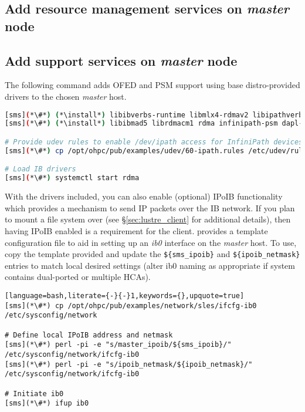 \documentclass[letterpaper]{article}
\newcommand{\install}{zypper -n install}
\begin{document}




\subsection{Add resource management services on {\em master} node} \label{sec:add_rm}


\subsection{Add \InfiniBand{} support services on {\em master} node} \label{sec:add_ofed}

The following command adds OFED and PSM support using base distro-provided drivers
to the chosen {\em master} host.

\begin{lstlisting}[language=bash,keywords={}]
[sms](*\#*) (*\install*) libibverbs-runtime libmlx4-rdmav2 libipathverbs-rdmav2
[sms](*\#*) (*\install*) libibmad5 librdmacm1 rdma infinipath-psm dapl-devel dapl-utils 

# Provide udev rules to enable /dev/ipath access for InfiniPath devices
[sms](*\#*) cp /opt/ohpc/pub/examples/udev/60-ipath.rules /etc/udev/rules.d/

# Load IB drivers
[sms](*\#*) systemctl start rdma
\end{lstlisting}



With the \InfiniBand{} drivers included, you can also enable (optional) IPoIB functionality
which provides a mechanism to send IP packets over the IB network. If you plan
to mount a \Lustre{} file system over \InfiniBand{} (see \S\ref{sec:lustre_client}
for additional details), then having IPoIB enabled is a requirement for the
\Lustre{} client. \OHPC{} provides a template configuration file to aid in setting up
an {\em ib0} interface on the {\em master} host. To use, copy the template
provided and update the \texttt{\$\{sms\_ipoib\}} and
\texttt{\$\{ipoib\_netmask\}} entries to match local desired settings (alter ib0
naming as appropriate if system contains dual-ported or multiple HCAs). 

\begin{lstlisting}[language=bash,literate={-}{-}1,keywords={},upquote=true]
[sms](*\#*) cp /opt/ohpc/pub/examples/network/sles/ifcfg-ib0 /etc/sysconfig/network

# Define local IPoIB address and netmask
[sms](*\#*) perl -pi -e "s/master_ipoib/${sms_ipoib}/" /etc/sysconfig/network/ifcfg-ib0
[sms](*\#*) perl -pi -e "s/ipoib_netmask/${ipoib_netmask}/" /etc/sysconfig/network/ifcfg-ib0

# Initiate ib0
[sms](*\#*) ifup ib0
\end{lstlisting}
\end{document}
